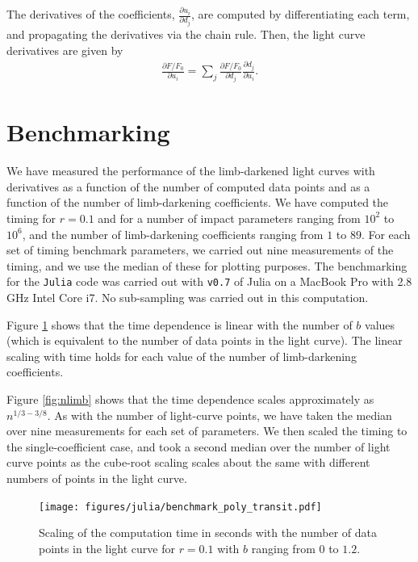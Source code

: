 \documentclass[modern]{aastex61}
\begin{document}
The derivatives of the coefficients, $\frac{\partial u_i}{\partial d_j}$, are 
computed by differentiating each term, and propagating the derivatives via the
chain rule.  Then, the light curve derivatives are given by
\begin{eqnarray}
\frac{\partial F/F_0}{\partial u_i} =  \sum_{j} \frac{\partial F/F_0}{\partial d_j}\frac{\partial d_j}{\partial u_i}.
\end{eqnarray}

\section{Benchmarking}\label{sec:benchmark}

We have measured the performance of the limb-darkened light curves
with derivatives as a function of the number of computed data points
and as a function of the number of limb-darkening coefficients.  We
have computed the timing for $r=0.1$ and for a number of impact
parameters ranging from $10^2$ to $10^6$, and the number of limb-darkening
coefficients ranging from $1$ to $89$.  For each set of timing benchmark
parameters, we carried out nine measurements  of the timing, and
we use the median of these for plotting purposes.  The benchmarking
for the \texttt{Julia} code was carried out with \texttt{v0.7} of
Julia on a MacBook Pro with 2.8 GHz Intel Core i7.
No sub-sampling was carried out in this computation.

Figure \ref{fig:ncoeff} shows that the time dependence is linear with the
number of $b$ values (which is equivalent to the number of data points
in the light curve).  The linear scaling with time holds for each value of
the number of limb-darkening coefficients.  

Figure \ref{fig:nlimb} shows that the time dependence scales approximately
as $n^{1/3-3/8}$.  As with the number of light-curve points, we have taken
the median over nine measurements for each set of parameters.  We then
scaled the timing to the single-coefficient case, and took a second
median over the number of light curve points as the cube-root scaling scales 
about the same with different numbers of points in the light curve.

\begin{figure}
    \begin{centering}
    \texttt{[image: figures/julia/benchmark\_poly\_transit.pdf]}
    \caption{Scaling of the computation time in seconds with the number of
    data points in the light curve for $r=0.1$ with $b$ ranging from $0$ to $1.2$.}
    \label{fig:ncoeff}
    \end{centering}
\end{figure}
\end{document}

